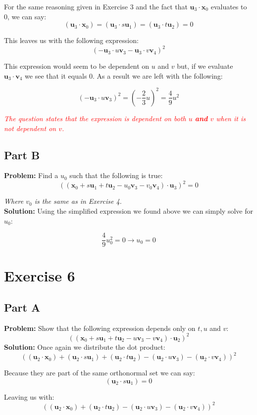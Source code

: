 \documentclass{article}
\begin{document}
For the same reasoning given in Exercise 3 and the fact that $\mathbf u_3\cdot\mathbf x_0$ evaluates to 0, we can say:
$$(\mathbf u_3\cdot\mathbf x_0)=(\mathbf u_3\cdot s\mathbf u_1)=(\mathbf u_3\cdot t\mathbf u_2)=0$$

This leaves us with the following expression:
$$(-\mathbf u_3\cdot u\mathbf v_3-\mathbf u_3\cdot v\mathbf v_4)^2$$

This expression would seem to be dependent on $u$ and $v$ but, if we evaluate $\mathbf u_3\cdot \mathbf v_4$ we see that it equals 0. As a result we are left with the following:

$$(-\mathbf u_3\cdot u\mathbf v_3)^2=\left(-\frac{2}{3}u\right)^2=\frac{4}{9}u^2$$

\textit{\textcolor{red}{The question states that the expression is dependent on both $u$ \textbf{and} $v$ when it is not dependent on $v$.}}

\subsection*{Part B}
\textbf{Problem:} Find a $u_0$ such that the following is true:
$$((\mathbf x_0+s\mathbf u_1+t\mathbf u_2-u_0\mathbf v_3-v_0\mathbf v_4)\cdot\mathbf u_3)^2=0$$

\textit{Where $v_0$ is the same as in Exercise 4.}
\\
\textbf{Solution:} Using the simplified expression we found above we can simply solve for $u_0$:

$$\frac{4}{9}u_0^2=0\rightarrow \boxed{u_0=0}$$

\section*{Exercise 6}
\subsection*{Part A}
\textbf{Problem:} Show that the following expression depends only on $t,u$ and $v$:
$$((\mathbf x_0+s\mathbf u_1+t\mathbf u_2-u\mathbf v_3-v\mathbf v_4)\cdot\mathbf u_2)^2$$
\textbf{Solution:} Once again we distribute the dot product:
$$((\mathbf u_2\cdot\mathbf x_0)+(\mathbf u_2\cdot s\mathbf u_1)+(\mathbf u_2\cdot t\mathbf u_2)-(\mathbf u_2\cdot u\mathbf v_3)-(\mathbf u_2\cdot v\mathbf v_4))^2$$

Because they are part of the same orthonormal set we can say:
$$(\mathbf u_2\cdot s\mathbf u_1)=0$$

Leaving us with:
$$((\mathbf u_2\cdot\mathbf x_0)+(\mathbf u_2\cdot t\mathbf u_2)-(\mathbf u_2\cdot u\mathbf v_3)-(\mathbf u_2\cdot v\mathbf v_4))^2$$
\end{document}
